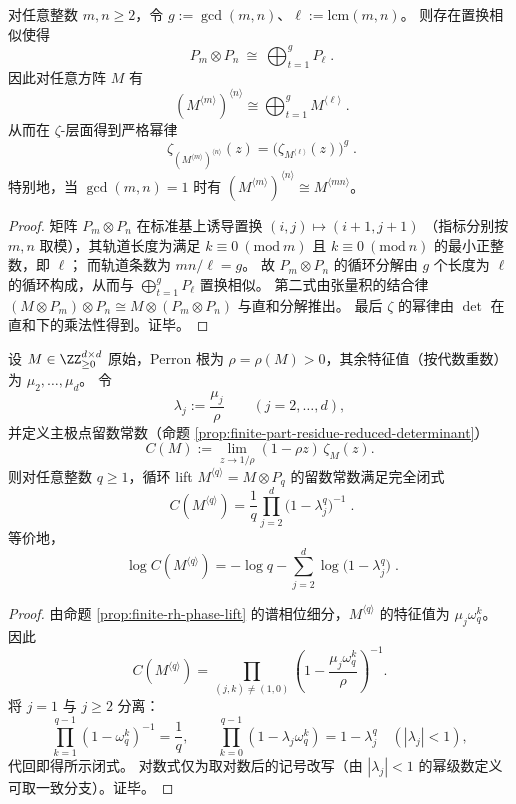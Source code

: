 \begin{proposition}\label{prop:finite-part-cyclic-lift-gcd-lcm}
对任意整数 \(m,n\ge 2\)，令 \(g:=\gcd(m,n)\)、\(\ell:=\mathrm{lcm}(m,n)\)。
则存在置换相似使得
\[
\boxed{\;
P_m\otimes P_n\ \cong\ \bigoplus_{t=1}^{g} P_{\ell}\; }.
\]
因此对任意方阵 \(M\) 有
\[
\boxed{\;
(M^{\langle m\rangle})^{\langle n\rangle}
\cong
\bigoplus_{t=1}^{g} M^{\langle \ell\rangle}\; }.
\]
从而在 \(\zeta\)-层面得到严格幂律
\[
\boxed{\;
\zeta_{(M^{\langle m\rangle})^{\langle n\rangle}}(z)
=\bigl(\zeta_{M^{\langle \ell\rangle}}(z)\bigr)^{g}\; }.
\]
特别地，当 \(\gcd(m,n)=1\) 时有 \((M^{\langle m\rangle})^{\langle n\rangle}\cong M^{\langle mn\rangle}\)。
\end{proposition}
\begin{proof}
矩阵 \(P_m\otimes P_n\) 在标准基上诱导置换
\(
(i,j)\mapsto(i+1,j+1)
\)
（指标分别按 \(m,n\) 取模），其轨道长度为满足 \(k\equiv 0\ (\mathrm{mod}\ m)\) 且 \(k\equiv 0\ (\mathrm{mod}\ n)\) 的最小正整数，即 \(\ell\)；
而轨道条数为 \(mn/\ell=g\)。
故 \(P_m\otimes P_n\) 的循环分解由 \(g\) 个长度为 \(\ell\) 的循环构成，从而与 \(\bigoplus_{t=1}^{g}P_\ell\) 置换相似。
第二式由张量积的结合律
\(
(M\otimes P_m)\otimes P_n\cong M\otimes(P_m\otimes P_n)
\)
与直和分解推出。
最后 \(\zeta\) 的幂律由 \(\det\) 在直和下的乘法性得到。证毕。
\end{proof}

\begin{theorem}\label{thm:finite-part-cyclic-lift-reduced-constant-closed}
设 \(M\in\ZZ_{\ge 0}^{d\times d}\) 原始，Perron 根为 \(\rho=\rho(M)>0\)，其余特征值（按代数重数）为 \(\mu_2,\dots,\mu_d\)。
令
\[
\lambda_j:=\frac{\mu_j}{\rho}\qquad(j=2,\dots,d),
\]
并定义主极点留数常数（命题 \ref{prop:finite-part-residue-reduced-determinant}）
\[
C(M):=\lim_{z\to 1/\rho}(1-\rho z)\,\zeta_M(z).
\]
则对任意整数 \(q\ge 1\)，循环 lift \(M^{\langle q\rangle}=M\otimes P_q\) 的留数常数满足完全闭式
\[
\boxed{\;
C(M^{\langle q\rangle})
=\frac{1}{q}\prod_{j=2}^{d}\bigl(1-\lambda_j^{q}\bigr)^{-1}\; }.
\]
等价地，
\[
\boxed{\;
\log C(M^{\langle q\rangle})
=-\log q-\sum_{j=2}^{d}\log\!\bigl(1-\lambda_j^{q}\bigr)\; }.
\]
\end{theorem}
\begin{proof}
由命题 \ref{prop:finite-rh-phase-lift} 的谱相位细分，\(M^{\langle q\rangle}\) 的特征值为 \(\mu_j\omega_q^k\)。
因此
\[
C(M^{\langle q\rangle})
=\prod_{(j,k)\neq(1,0)}\left(1-\frac{\mu_j\omega_q^k}{\rho}\right)^{-1}.
\]
将 \(j=1\) 与 \(j\ge 2\) 分离：
\[
\prod_{k=1}^{q-1}(1-\omega_q^k)^{-1}=\frac{1}{q},
\qquad
\prod_{k=0}^{q-1}\left(1-\lambda_j\omega_q^k\right)=1-\lambda_j^{q}\quad(|\lambda_j|<1),
\]
代回即得所示闭式。
对数式仅为取对数后的记号改写（由 \(|\lambda_j|<1\) 的幂级数定义可取一致分支）。证毕。
\end{proof}

